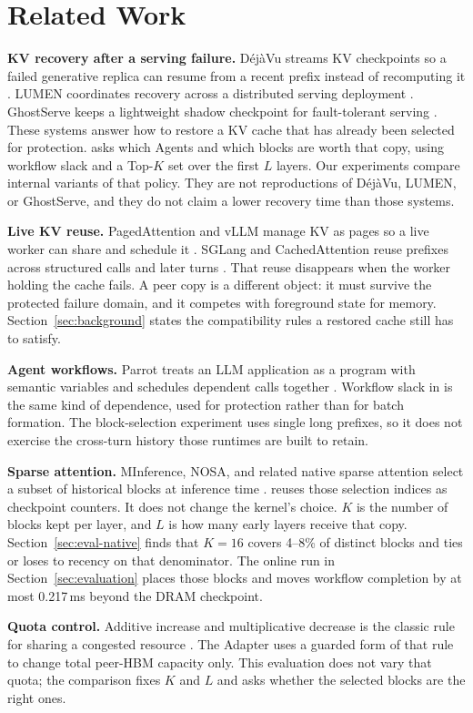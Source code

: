 \section{Related Work}
\label{sec:related}

\textbf{KV recovery after a serving failure.}
D\'ej\`aVu streams KV checkpoints so a failed generative replica can resume
from a recent prefix instead of recomputing it \cite{strati2024dejavu}.
LUMEN coordinates recovery across a distributed serving deployment
\cite{cao2026lumen}. GhostServe keeps a lightweight shadow checkpoint for
fault-tolerant serving \cite{jayakody2026ghostserve}. These systems answer
how to restore a KV cache that has already been selected for protection.
\system asks which Agents and which blocks are worth that copy, using workflow slack and
a Top-$K$ set over the first $L$ layers. Our experiments compare internal
variants of that policy. They are not reproductions of D\'ej\`aVu, LUMEN, or
GhostServe, and they do not claim a lower recovery time than those systems.

\textbf{Live KV reuse.}
PagedAttention and vLLM manage KV as pages so a live worker can share and
schedule it \cite{kwon2023vllm}. SGLang and CachedAttention reuse prefixes
across structured calls and later turns \cite{zheng2024sglang,gao2024cachedattention}.
That reuse disappears when the worker holding the cache fails. A peer copy is
a different object: it must survive the protected failure domain, and it
competes with foreground state for memory. Section~\ref{sec:background}
states the compatibility rules a restored cache still has to satisfy.

\textbf{Agent workflows.}
Parrot treats an LLM application as a program with semantic variables and
schedules dependent calls together \cite{lin2024parrot}. Workflow slack in
\system is the same kind of dependence, used for protection rather than for
batch formation. The block-selection experiment uses single long prefixes, so
it does not exercise the cross-turn history those runtimes are built to
retain.

\textbf{Sparse attention.}
MInference, NOSA, and related native sparse attention select a subset of
historical blocks at inference time \cite{jiang2024minference,huang2026nosav2}.
\system reuses those selection indices as checkpoint counters. It does not
change the kernel's choice. $K$ is the number of blocks kept per layer, and
$L$ is how many early layers receive that copy. Section~\ref{sec:eval-native}
finds that $K=16$ covers 4--8\% of distinct blocks and ties or loses to
recency on that denominator. The online run in Section~\ref{sec:evaluation}
places those blocks and moves workflow completion by at most 0.217\,ms
beyond the DRAM checkpoint.

\textbf{Quota control.}
Additive increase and multiplicative decrease is the classic rule for sharing
a congested resource \cite{chiu1989aimd}. The Adapter uses a guarded form of
that rule to change total peer-HBM capacity only. This evaluation does not
vary that quota; the comparison fixes $K$ and $L$ and asks whether the
selected blocks are the right ones.
